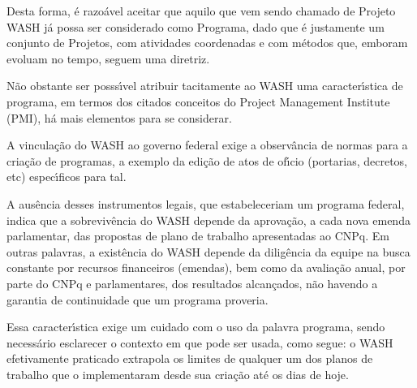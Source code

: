 \documentclass[
12pt,		%
openright,	%
twoside,  %
a4paper,			%
chapter=TITLE,		%
english,			%
french,				%
spanish,			%
brazil				%
]{USPSC-classe/USPSC}
\begin{document}
Desta forma, \'e razo\'avel aceitar que aquilo que vem sendo chamado de Projeto WASH j\'a possa ser considerado como Programa, dado que \'e justamente um conjunto de Projetos, com atividades coordenadas e com m\'etodos que, emboram evoluam no tempo, seguem uma diretriz.










N\~ao obstante ser posss\'{\i}vel atribuir tacitamente ao WASH uma caracter\'{\i}stica de programa, em termos dos citados conceitos do Project Management Institute (PMI), h\'a mais elementos para se considerar.










A vincula\c{c}\~ao do WASH ao governo federal exige a observ\^ancia de normas para a cria\c{c}\~ao de programas, a exemplo da edi\c{c}\~ao de atos de of\'{\i}cio (portarias, decretos, etc) espec\'{\i}ficos para tal.










A aus\^encia desses instrumentos legais, que estabeleceriam um \textquotedbl programa federal\textquotedbl , indica que a sobreviv\^encia do WASH depende da aprova\c{c}\~ao, a cada nova emenda parlamentar, das propostas de plano de trabalho apresentadas ao CNPq. Em outras palavras, a exist\^encia do WASH depende da dilig\^encia da equipe na busca constante por recursos financeiros (emendas), bem como da avalia\c{c}\~ao anual, por parte do CNPq e parlamentares, dos resultados alcan\c{c}ados, n\~ao havendo a garantia de continuidade que um programa proveria.










Essa caracter\'{\i}stica exige um cuidado com o uso da palavra \textquotedbl programa\textquotedbl , sendo necess\'ario esclarecer o contexto em que pode ser usada, como segue: o WASH efetivamente praticado extrapola os limites de qualquer um dos planos de trabalho que o implementaram desde sua cria\c{c}\~ao at\'e os dias de hoje.
\end{document}
